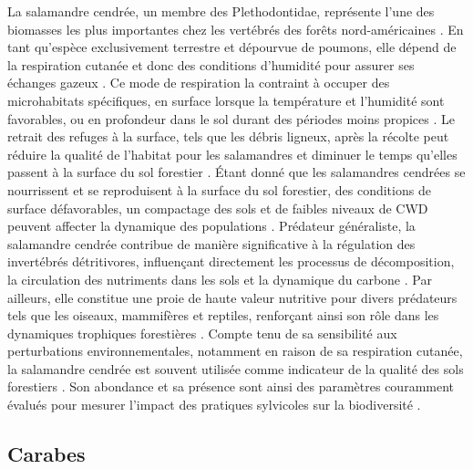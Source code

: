 La salamandre cendrée, un membre des Plethodontidae, représente l'une des biomasses les plus importantes chez les vertébrés des forêts nord-américaines \citep{Burton1975Salamanderpopulations,Petranka1993Effectstimber,semlitschAbundanceBiomassProduction2014a}. 
En tant qu'espèce exclusivement terrestre et dépourvue de poumons, elle dépend de la respiration cutanée et donc des conditions d'humidité pour assurer ses échanges gazeux \citep{Heatwole1961Relationsubstrate}. 
Ce mode de respiration la contraint à occuper des microhabitats spécifiques, en surface lorsque la température et l'humidité sont favorables, ou en profondeur dans le sol durant des périodes moins propices \citep{Grizzell1949HibernationSite,FraserEmpiricalEvaluation1976,Jaeger1980MicrohabitatsTerrestrial}. 
Le retrait des refuges à la surface, tels que les débris ligneux, après la récolte peut réduire la qualité de l'habitat pour les salamandres et diminuer le temps qu'elles passent à la surface du sol forestier \citep{Achat2015Quantifyingconsequences,Peele2017EffectsWoody}. 
Étant donné que les salamandres cendrées se nourrissent et se reproduisent à la surface du sol forestier, des conditions de surface défavorables, un compactage des sols et de faibles niveaux de CWD peuvent affecter la dynamique des populations \citep{Peterman2014Spatialvariation}. 
Prédateur généraliste, la salamandre cendrée contribue de manière significative à la régulation des invertébrés détritivores, influençant directement les processus de décomposition, la circulation des nutriments dans les sols et la dynamique du carbone \citep{Burton1975Energyflow,Wyman1998Experimentalassessment,Walton2013Topdownregulation,Hickerson2017Easternredbacked}. 
Par ailleurs, elle constitue une proie de haute valeur nutritive pour divers prédateurs tels que les oiseaux, mammifères et reptiles, renforçant ainsi son rôle dans les dynamiques trophiques forestières \citep{Burton1975Energyflow,Pough1987abundancesalamanders,Petranka1998SalamandersUnited}. 
Compte tenu de sa sensibilité aux perturbations environnementales, notamment en raison de sa respiration cutanée, la salamandre cendrée est souvent utilisée comme indicateur de la qualité des sols forestiers \citep{Welsh2001caseusing}. 
Son abondance et sa présence sont ainsi des paramètres couramment évalués pour mesurer l'impact des pratiques sylvicoles sur la biodiversité \citep{Harpole1999Effectsseven,Grialou2000effectsforest,Homyack2009Longtermeffects,Hocking2013Effectsexperimental,Mazerolle2021Woodlandsalamander}. 

\subsection*{Carabes}

